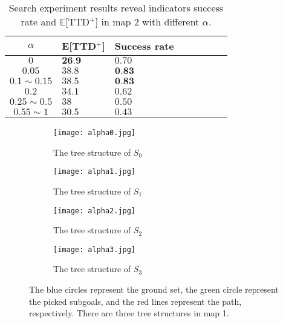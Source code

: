 \begin{table}[htbp]
   \caption{Search experiment results reveal indicators success rate and $\mathbb{E}$[TTD$^+$] in map 2 with different $\alpha$.}
   \begin{center}
     \begin{tabular}{| c | l | l | l | l | l |  l | l |} \hline
     $\alpha$ & E[TTD$^+$] & Success rate\\ \hline
     $0$             & $\textbf{26.9}$  & $0.70$\\ \hline
     $0.05$          & $38.8$           & $\textbf{0.83}$\\ \hline
     $0.1\sim 0.15$  & $38.5$           & $\textbf{0.83}$\\ \hline
     $0.2$           & $34.1$           & $0.62$ \\ \hline
     $0.25\sim 0.5$  & $38$             & $0.50$\\ \hline
     $0.55\sim 1$    & $30.5$           & $0.43$ \\ \hline
    \end{tabular}
   \end{center}
   \label{tab:ETTD_alpha_map2}
\end{table}

\begin{figure}[htbp]
 \begin{center}
\begin{subfigure}{.45\textwidth}
  \centering
  \texttt{[image: alpha0.jpg]}
  \caption{The tree structure of $S_0$}
\end{subfigure}
\begin{subfigure}{.45\textwidth}
  \centering
  \texttt{[image: alpha1.jpg]}
  \caption{The tree structure of $S_1$}
\end{subfigure}
\begin{subfigure}{.45\textwidth}
  \centering
  \texttt{[image: alpha2.jpg]}
  \caption{The tree structure of $S_2$}
\end{subfigure}
%
\begin{subfigure}{.45\textwidth}
  \centering
  \texttt{[image: alpha3.jpg]}
  \caption{The tree structure of $S_3$}
\end{subfigure}
\caption{The blue circles represent the ground set, the green circle represent the picked subgoals, and the red lines represent the path, respectively. There are three tree structures in map 1.}
\label{fig:trees_map1}
 \end{center}
 \end{figure}

